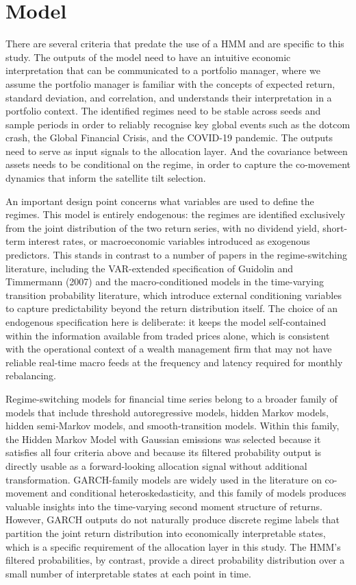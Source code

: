 \documentclass[12pt, a4paper]{article}
\begin{document}
\clearpage
\section{Model}
\label{sec:model}

There are several criteria that predate the use of a HMM and are specific to this study.
The outputs of the model need to have an intuitive economic interpretation that can be
communicated to a portfolio manager, where we assume the portfolio manager is familiar with
the concepts of expected return, standard deviation, and correlation, and understands their
interpretation in a portfolio context. The identified regimes need to be stable across seeds
and sample periods in order to reliably recognise key global events such as the dotcom crash,
the Global Financial Crisis, and the COVID-19 pandemic. The outputs need to serve as input
signals to the allocation layer. And the covariance between assets needs to be conditional
on the regime, in order to capture the co-movement dynamics that inform the satellite tilt
selection.

An important design point concerns what variables are used to define the regimes. This model
is entirely endogenous: the regimes are identified exclusively from the joint distribution
of the two return series, with no dividend yield, short-term interest rates, or
macroeconomic variables introduced as exogenous predictors. This stands in contrast to a
number of papers in the regime-switching literature, including the VAR-extended specification
of Guidolin and Timmermann (2007) and the macro-conditioned models in the time-varying
transition probability literature, which introduce external conditioning variables to capture
predictability beyond the return distribution itself. The choice of an endogenous
specification here is deliberate: it keeps the model self-contained within the information
available from traded prices alone, which is consistent with the operational context of a
wealth management firm that may not have reliable real-time macro feeds at the frequency and
latency required for monthly rebalancing.

Regime-switching models for financial time series belong to a broader family of models that
include threshold autoregressive models, hidden Markov models, hidden semi-Markov models,
and smooth-transition models. Within this family, the Hidden Markov Model with Gaussian
emissions was selected because it satisfies all four criteria above and because its filtered
probability output is directly usable as a forward-looking allocation signal without
additional transformation. GARCH-family models are widely used in the literature on
co-movement and conditional heteroskedasticity, and this family of models produces valuable
insights into the time-varying second moment structure of returns. However, GARCH outputs do
not naturally produce discrete regime labels that partition the joint return distribution
into economically interpretable states, which is a specific requirement of the allocation
layer in this study. The HMM's filtered probabilities, by contrast, provide a direct
probability distribution over a small number of interpretable states at each point in time.
\end{document}
